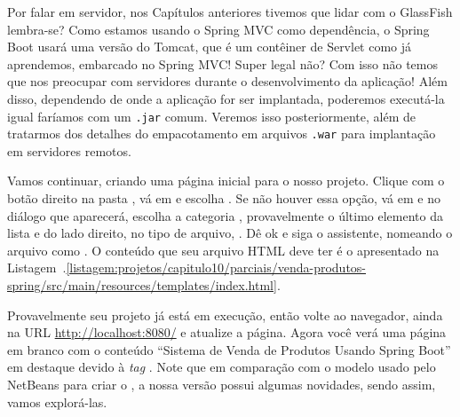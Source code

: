 Por falar em servidor, nos Capítulos anteriores tivemos que lidar com o GlassFish lembra-se? Como estamos usando o Spring MVC como dependência, o Spring Boot usará uma versão do Tomcat, que é um contêiner de Servlet como já aprendemos, embarcado no Spring MVC! Super legal não? Com isso não temos que nos preocupar com servidores durante o desenvolvimento da aplicação! Além disso, dependendo de onde a aplicação for ser implantada, poderemos executá-la igual faríamos com um \texttt{.jar} comum. Veremos isso posteriormente, além de tratarmos dos detalhes do empacotamento em arquivos \texttt{.war} para implantação em servidores remotos.

Vamos continuar, criando uma página inicial para o nosso projeto. Clique com o botão direito na pasta , vá em  e escolha . Se não houver essa opção, vá em  e no diálogo que aparecerá, escolha a categoria , provavelmente o último elemento da lista e do lado direito, no tipo de arquivo, . Dê ok e siga o assistente, nomeando o arquivo como . O conteúdo que seu arquivo HTML deve ter é o apresentado na Listagem~\thechapter.\ref{listagem:projetos/capitulo10/parciais/venda-produtos-spring/src/main/resources/templates/index.html}.


Provavelmente seu projeto já está em execução, então volte ao navegador, ainda na URL \url{http://localhost:8080/} e atualize a página. Agora você verá uma página em branco com o conteúdo ``Sistema de Venda de Produtos Usando Spring Boot'' em destaque devido à \textit{tag} . Note que em comparação com o modelo usado pelo NetBeans para criar o , a nossa versão possui algumas novidades, sendo assim, vamos explorá-las.

